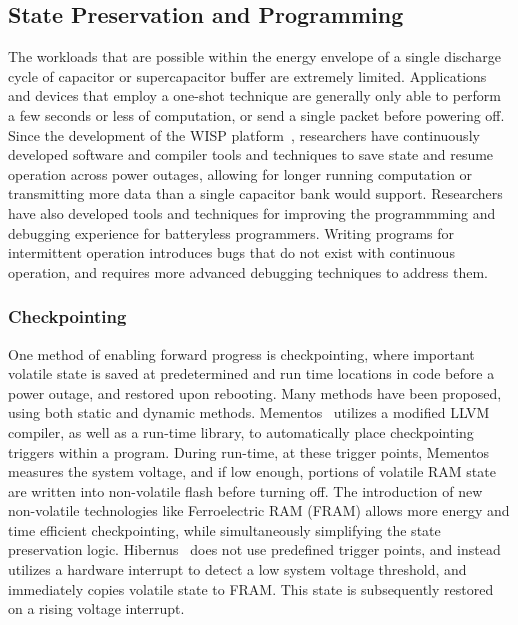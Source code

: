 \subsection{State Preservation and Programming}
The workloads that are possible within the energy envelope of a single discharge cycle of capacitor or supercapacitor buffer are extremely limited.
Applications and devices that employ a one-shot technique are generally only able to perform a few seconds or less of computation, or send a single packet before powering off.
Since the development of the WISP platform~\cite{sample2008design}, researchers have continuously developed software and compiler tools and techniques to save state and resume operation across power outages, allowing for longer running computation or transmitting more data than a single capacitor bank would support.
Researchers have also developed tools and techniques for improving the programmming and debugging experience for batteryless programmers. Writing programs for intermittent operation introduces bugs that do not exist with continuous operation, and requires more advanced debugging techniques to address them. 

\subsubsection{Checkpointing}
One method of enabling forward progress is checkpointing,
where important volatile state is saved at predetermined and run time locations in code before a power outage, and restored upon rebooting. Many methods have been proposed, using both static and dynamic methods. 
Mementos~\cite{ransford2012mementos} utilizes a modified LLVM compiler, as well as a run-time library, to automatically place checkpointing triggers within a program. During run-time, at these trigger points, Mementos measures the system voltage, and if low enough, portions of volatile RAM state are written into non-volatile flash before turning off.
The introduction of new non-volatile technologies like Ferroelectric RAM (FRAM) allows more energy and time efficient checkpointing, while simultaneously simplifying the state preservation logic.
Hibernus~\cite{balsamo2014hibernus} does not use predefined trigger points, and instead utilizes a hardware interrupt to detect a low system voltage threshold, and immediately copies volatile state to FRAM. This state is subsequently restored on a rising voltage interrupt.


